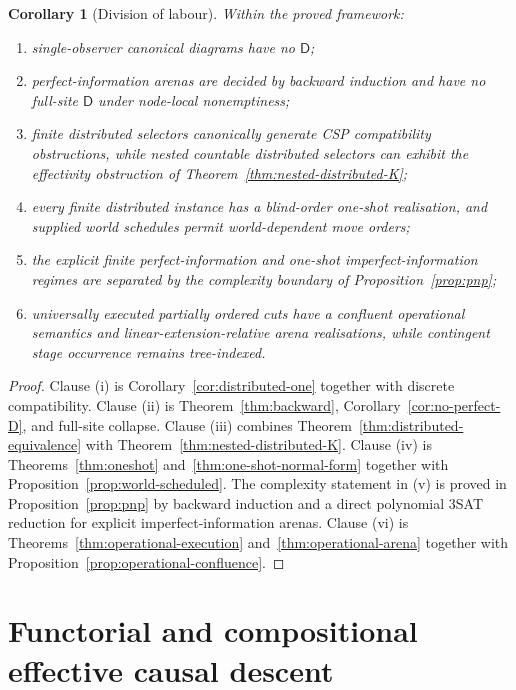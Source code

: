 \documentclass[11pt]{article}
\theoremstyle{plain}
\newtheorem{corollary}[theorem]{Corollary}
\theoremstyle{definition}
\theoremstyle{remark}
\begin{document}
\begin{corollary}[Division of labour]\label{cor:division}
Within the proved framework:
\begin{enumerate}[label=(\roman*)]
\item single-observer canonical diagrams have no $\mathsf D$;
\item perfect-information arenas are decided by backward induction and have no
full-site $\mathsf D$ under node-local nonemptiness;
\item finite distributed selectors canonically generate CSP compatibility
obstructions, while nested countable distributed selectors can exhibit the
effectivity obstruction of Theorem~\ref{thm:nested-distributed-K};
\item every finite distributed instance has a blind-order one-shot realisation,
and supplied world schedules permit world-dependent move orders;
\item the explicit finite perfect-information and one-shot imperfect-information
regimes are separated by the complexity boundary of Proposition~\ref{prop:pnp};
\item universally executed partially ordered cuts have a confluent operational
semantics and linear-extension-relative arena realisations, while contingent
stage occurrence remains tree-indexed.
\end{enumerate}
\end{corollary}


\begin{proof}
Clause (i) is Corollary~\ref{cor:distributed-one} together with discrete
compatibility. Clause (ii) is Theorem~\ref{thm:backward},
Corollary~\ref{cor:no-perfect-D}, and full-site collapse. Clause (iii) combines
Theorem~\ref{thm:distributed-equivalence} with
Theorem~\ref{thm:nested-distributed-K}. Clause (iv) is
Theorems~\ref{thm:oneshot} and~\ref{thm:one-shot-normal-form} together with
Proposition~\ref{prop:world-scheduled}. The complexity statement in (v) is
proved in Proposition~\ref{prop:pnp} by backward induction and a direct
polynomial 3SAT reduction for explicit imperfect-information arenas. Clause (vi) is
Theorems~\ref{thm:operational-execution} and~\ref{thm:operational-arena} together
with Proposition~\ref{prop:operational-confluence}.
\end{proof}


\section{Functorial and compositional effective causal descent}
\label{sec:functorial-programme}
\end{document}
